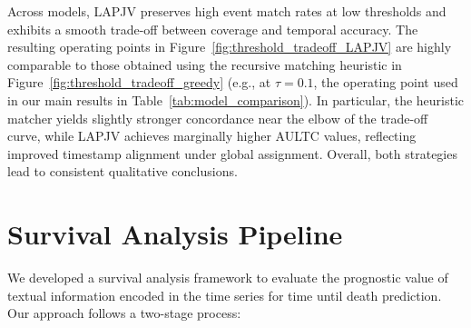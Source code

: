 \documentclass[pdflatex,sn-mathphys-num]{sn-jnl}%
\theoremstyle{thmstyleone}%
\theoremstyle{thmstyletwo}%
\theoremstyle{thmstylethree}%
\begin{document}
Across models, LAPJV preserves high event match rates at low thresholds and exhibits a
smooth trade-off between coverage and temporal accuracy. 
The resulting operating points in Figure~\ref{fig:threshold_tradeoff_LAPJV}
are highly comparable to those obtained using the recursive matching heuristic in Figure~\ref{fig:threshold_tradeoff_greedy} (e.g., at $\tau=0.1$, the operating point used in our main results in Table~\ref{tab:model_comparison}). 
In particular,
the heuristic matcher yields slightly stronger concordance near the elbow of the trade-off
curve, while LAPJV achieves marginally higher AULTC values, reflecting improved timestamp
alignment under global assignment. 
Overall, both strategies lead to consistent qualitative
conclusions.





\section{Survival Analysis Pipeline}
\label{apd:survival-analysis-pipeline}

We developed a survival analysis framework to evaluate the prognostic value of textual information encoded in the time series for time until death prediction. 
Our approach follows a two-stage process:

\end{document}
